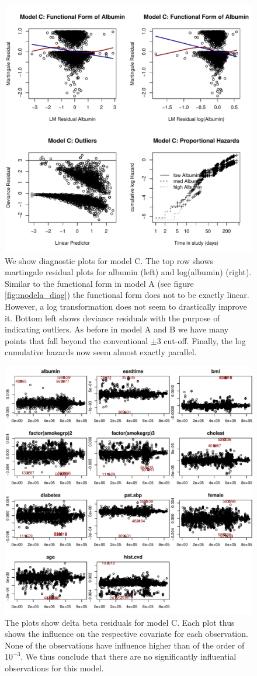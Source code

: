 \documentclass[paper=a4, fontsize=11pt]{scrartcl} %
\numberwithin{equation}{section} %
\numberwithin{figure}{section} %
\numberwithin{table}{section} %
\begin{document}
\begin{figure}[H]
\centering
\includegraphics[width=.8\textwidth]{plots/modelc_diag.pdf}
\caption{We show diagnostic plots for model C. The top row shows martingale residual plots for albumin (left) and log(albumin) (right). Similar to the functional form in model A (see figure \ref{fig:modela_diag}) the functional form does not to be exactly linear. However, a log transformation does not seem to drastically improve it. Bottom left shows deviance residuals with the purpose of indicating outliers. As before in model A and B we have many points that fall beyond the conventional $\pm 3$ cut-off. Finally, the log cumulative hazards now seem almost exactly parallel.}
\label{fig:modelc_diag}
\end{figure}

\begin{figure}[H]
\centering
\includegraphics[width=.8\textwidth]{plots/modelc_dfbeta.pdf}
\caption{The plots show delta beta residuals for model C. Each plot thus shows the influence on the respective covariate for each observation. None of the observations have influence higher than of the order of $10^{-3}$. We thus conclude that there are no significantly influential observations for this model.}
\label{fig:modelc_dfbeta}
\end{figure}
\end{document}
